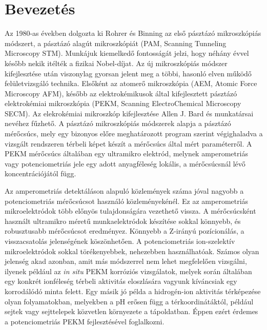 \chapter{Bevezetés}
\pagestyle{headings}

Az 1980-as években dolgozta ki Rohrer és Binning az első pásztázó mikroszkópiás módszert, a pásztázó alagút mikroszkópiát (PAM, Scanning Tunneling Microscopy STM). Munkájuk kiemelkedő fontosságát jelzi, hogy néhány évvel később nekik itélték a fizikai Nobel-díjat. Az új mikroszkópiás módszer kifejlesztése után viszonylag gyorsan jelent meg a többi, hasonló elven működő felületvizsgáló technika. Elsőként az atomerő  mikroszkópia (AEM, Atomic Force Microscopy AFM), később az elektrokémikusok által kifejlesztett pásztázó elektrokémiai mikroszkópia (PEKM, Scanning ElectroChemical Microscopy SECM). Az elekrokémiai mikroszkóp kifejlesztése Allen J. Bard és munkatársai nevéhez fűzhető. A pásztázó mikroszkópiás módszerek alapja a pásztázó mérőcsúcs, mely egy bizonyos előre meghatározott program szerint végighaladva a vizsgált rendszeren térbeli képet készít a mérőcsúcs által mért paraméterről. A PEKM mérőcsúcs általában egy ultramikro elektród, melynek amperometriás vagy potenciometriás jele egy adott anyagféleség lokális, a mérőcsúcsnál lévő koncentrációjától függ.

Az amperometriás detektáláson alapuló közlemények száma jóval nagyobb a potenciometriás mérőcsúcsot használó közleményekénél. Ez az amperometriás mikroelektródok több előnyös tulajdonságára vezethető vissza. A mérőcsúcsként használt ultramikro méretű munkaelektródok készítése sokkal könnyebb, és robusztusabb mérőcsúcsot eredményez. Könnyebb a Z-irányú pozícionálás, a visszacsatolás jelenségének köszönhetően. A potenciometriás ion-szelektív mikroelektródok sokkal törékenyebbek, nehezebben használhatóak. Számos olyan jelenség akad azonban, amit más módszerrel nem lehet megfelelően vizsgálni, ilyenek például az \emph{in situ} PEKM korróziós vizsgálatok, melyek során általában egy konkrét ionféleség térbeli aktivitás eloszlására vagyunk kíváncsiak egy korrodálódó minta felett. Egy másik jó példa a hidrogén-ion aktivitás térképezése olyan folyamatokban, melyekben a pH erősen függ a térkoordinátáktól, például sejtek vagy sejttelepek közvetlen környezete a tápoldatban. Éppen ezért érdemes a potenciometriás PEKM fejlesztésével foglalkozni.

